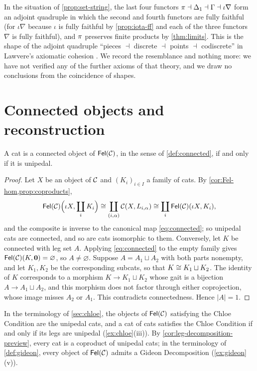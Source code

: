 \begin{remark}\label{rem:cohesion}
In the situation of \cref{prop:set-string}, the last four functors
$\pi\dashv\Delta_1\dashv\Gamma\dashv\iota\nabla$ form an adjoint quadruple
in which the second and fourth functors are fully faithful (for $\iota\nabla$
because $\iota$ is fully faithful by \cref{prop:iota-ff} and each of the three
functors $\nabla$ is fully faithful), and $\pi$
preserves finite products by \cref{thm:limits}. This is the shape of the
adjoint quadruple ``pieces $\dashv$ discrete $\dashv$ points $\dashv$
codiscrete'' in Lawvere's axiomatic cohesion \cite{Lawvere2007}. We record the
resemblance and nothing more: we have not verified any of the further axioms
of that theory, and we draw no conclusions from the coincidence of shapes.
\end{remark}

\section{Connected objects and reconstruction}\label{sec:reconstruction}

\begin{proposition}\label{prop:connected-unipedal}
A cat is a connected object of $\mathsf{Fel}(\mathcal{C})$, in the sense of
\cref{def:connected}, if and only if it is unipedal.
\end{proposition}

\begin{proof}
Let $X$ be an object of $\mathcal{C}$ and $(K_i)_{i\in I}$ a family of cats. By
\cref{cor:Fel-hom,prop:coproducts},
\[
\mathsf{Fel}(\mathcal{C})\Bigl(\iota X,\coprod_iK_i\Bigr)\cong\coprod_{(i,\alpha)}\mathcal{C}(X,L_{i,\alpha})
\cong\coprod_i\mathsf{Fel}(\mathcal{C})(\iota X,K_i),
\]
and the composite is inverse to the canonical map \eqref{eq:connected}; so
unipedal cats are connected, and so are cats isomorphic to them. Conversely,
let $K$ be connected with leg set $A$. Applying \eqref{eq:connected} to the
empty family gives $\mathsf{Fel}(\mathcal{C})(K,\mathbf{0})=\varnothing$, so $A\neq\varnothing$.
Suppose $A=A_1\sqcup A_2$ with both parts nonempty, and let $K_1,K_2$ be the
corresponding subcats, so that $K\cong K_1\sqcup K_2$. The identity of $K$
corresponds to a morphism $K\to K_1\sqcup K_2$ whose gait is a bijection
$A\to A_1\sqcup A_2$, and this morphism does not factor through either
coprojection, whose image misses $A_2$ or $A_1$. This contradicts
connectedness. Hence $|A|=1$.
\end{proof}

\begin{remark}\label{rem:connected-unipedal-chloe}
In the terminology of \cref{sec:chloe}, the objects of $\mathsf{Fel}(\mathcal{C})$ satisfying
the Chloe Condition are the unipedal cats, and a cat of cats satisfies the Chloe
Condition if and only if its legs are unipedal (\cref{ex:chloe}(iii)). By
\cref{cor:leg-decomposition-preview}, every cat is a coproduct of unipedal cats;
in the terminology of \cref{def:gideon}, every object of $\mathsf{Fel}(\mathcal{C})$ admits a
Gideon Decomposition (\cref{ex:gideon}(v)).
\end{remark}



